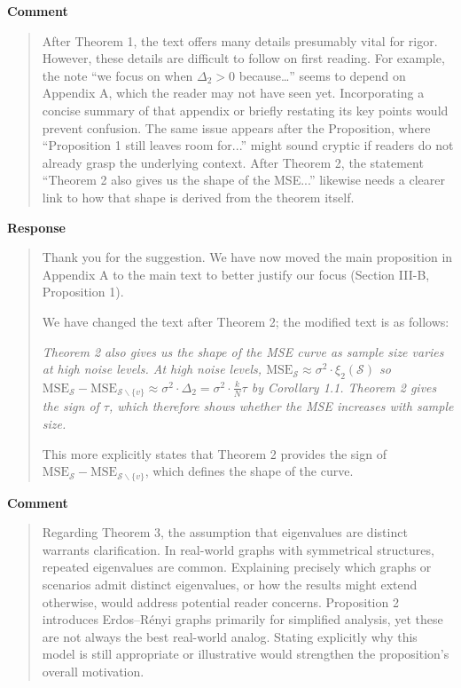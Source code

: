 \documentclass[11pt,onecolumn,journal]{IEEEtran}
\theoremstyle{definition}
\newcommand{\set}[1]{\mathcal{#1}}
\begin{document}
\textbf{Comment}
\begin{quote}
After Theorem 1, the text offers many details presumably vital for rigor. However, these details are difficult to follow on first reading. For example, the note “we focus on when $\Delta_2>0$ because…” seems to depend on Appendix A, which the reader may not have seen yet. Incorporating a concise summary of that appendix or briefly restating its key points would prevent confusion. The same issue appears after the Proposition, where “Proposition 1 still leaves room for...” might sound cryptic if readers do not already grasp the underlying context. After Theorem 2, the statement “Theorem 2 also gives us the shape of the MSE...” likewise needs a clearer link to how that shape is derived from the theorem itself.
\end{quote}

\textbf{Response}
\begin{quote}
Thank you for the suggestion. We have now moved the main proposition in Appendix A to the main text to better justify our focus (Section III-B, Proposition 1). 

We have changed the text after Theorem 2; the modified text is as follows:

{\it Theorem 2 also gives us the shape of the MSE curve as sample size varies at high noise levels.  At high noise levels, $\text{MSE}_{\set{S}} \approx \sigma^{2} \cdot \xi_{2}(\set{S})$ so  $\text{MSE}_{\set{S}} - \text{MSE}_{\set{S}\backslash \{v\}} \approx \sigma^{2} \cdot \Delta_{2} = \sigma^{2} \cdot \frac{k}{N} \tau$ by Corollary 1.1. Theorem 2 gives the sign of $\tau$, which therefore shows whether the MSE increases with sample size.}

This more explicitly states that Theorem 2 provides the sign of $\text{MSE}_{\set{S}} - \text{MSE}_{\set{S}\backslash \{v\}}$, which defines the shape of the curve.
\end{quote}

\textbf{Comment}
\begin{quote}
Regarding Theorem 3, the assumption that eigenvalues are distinct warrants clarification. In real-world graphs with symmetrical structures, repeated eigenvalues are common. Explaining precisely which graphs or scenarios admit distinct eigenvalues, or how the results might extend otherwise, would address potential reader concerns. Proposition 2 introduces Erdos–Rényi graphs primarily for simplified analysis, yet these are not always the best real-world analog. Stating explicitly why this model is still appropriate or illustrative would strengthen the proposition’s overall motivation.
\end{quote}
\end{document}

